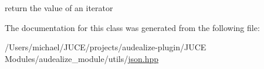 return the value of an iterator 



The documentation for this class was generated from the following file\+:\begin{DoxyCompactItemize}
\item 
/\+Users/michael/\+J\+U\+C\+E/projects/audealize-\/plugin/\+J\+U\+C\+E Modules/audealize\+\_\+module/utils/\hyperlink{json_8hpp}{json.\+hpp}\end{DoxyCompactItemize}
